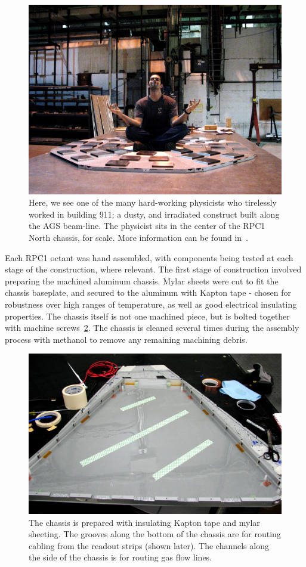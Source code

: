 \begin{figure}
  \centering
  \includegraphics[width=0.7\linewidth]{./figures/mike_in_rpc1}
  \caption{
    Here, we see one of the many hard-working physicists who tirelessly worked
    in building 911: a dusty, and irradiated construct built along the AGS
    beam-line. The physicist sits in the center of the RPC1 North chassis, for
    scale. More information can be found in~\cite{Beaumier2016}.
  }
  \label{fig:mike_in_rpc1}
\end{figure}

Each RPC1 octant was hand assembled, with components being tested at each stage
of the construction, where relevant. The first stage of construction involved
preparing the machined aluminum chassis. Mylar sheets were cut to fit the
chassis baseplate, and secured to the aluminum with Kapton tape - chosen for
robustness over high ranges of temperature, as well as good electrical
insulating properties. The chassis itself is not one machined piece, but is
bolted together with machine screws~\ref{fig:rpc1_construction_1}. The chassis
is cleaned several times during the assembly process with methanol to remove any
remaining machining debris.

\begin{figure}
  \centering
  \includegraphics[width=0.7\linewidth]{./figures/rpc1_construction_1}
  \caption{
    The chassis is prepared with insulating Kapton tape and mylar sheeting. The
    grooves along the bottom of the chassis are for routing cabling from the
    readout strips (shown later). The channels along the side of the chassis is
    for routing gas flow lines.
  }
  \label{fig:rpc1_construction_1}
\end{figure}


